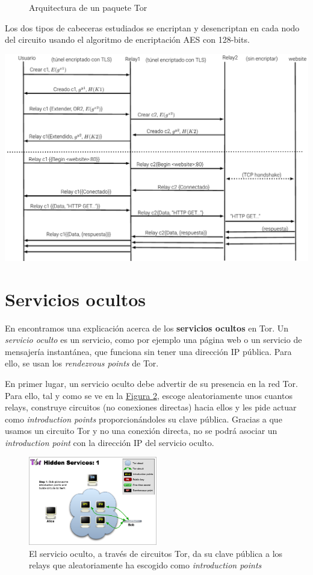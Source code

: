 \documentclass[10pt,a4paper,spanish]{article}
\begin{document}
\begin{figure}[!h]
    \centering
    
    \caption{Arquitectura de un paquete Tor}
    \label{paquete}
\end{figure}

Los dos tipos de cabeceras estudiados se encriptan y desencriptan en cada nodo del circuito usando el algoritmo de encriptación AES con 128-bits.

\includegraphics[width=1\textwidth]{comunicaciones}

\section{Servicios ocultos}
En \cite{hiddenservices} encontramos una explicación acerca de los \textbf{servicios ocultos} en Tor. Un \textit{servicio oculto} es un servicio, como por ejemplo una página web o un servicio de mensajería instantánea, que funciona sin tener una dirección IP pública. Para ello, se usan los \textit{rendezvous points} de Tor.

En primer lugar, un servicio oculto debe advertir de su presencia en la red Tor. Para ello, tal y como se ve en la \hyperref[ths1]{Figura \ref*{ths1}}, escoge aleatoriamente unos cuantos relays, construye circuitos (no conexiones directas) hacia ellos y les pide actuar como \textit{introduction points} proporcionándoles su clave pública. Gracias a que usamos un circuito Tor y no una conexión directa, no se podrá asociar un \textit{introduction point} con la dirección IP del servicio oculto.

\begin{figure}[!h]
    \centering
    \includegraphics[width=0.5\textwidth]{THS-1}
    \caption{El servicio oculto, a través de circuitos Tor, da su clave pública a los relays que aleatoriamente ha escogido como \textit{introduction points}}
    \label{ths1}
\end{figure}
\end{document}
